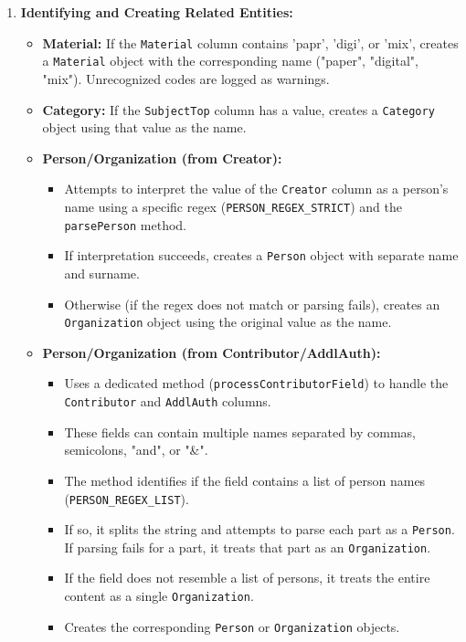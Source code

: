 \begin{enumerate}
    \item \textbf{Identifying and Creating Related Entities:}
        \begin{itemize}
            \item \textbf{Material:} If the \texttt{Material} column contains 'papr', 'digi', or 'mix', creates a \texttt{Material} object with the corresponding name ("paper", "digital", "mix"). Unrecognized codes are logged as warnings.
            \item \textbf{Category:} If the \texttt{SubjectTop} column has a value, creates a \texttt{Category} object using that value as the name.
            \item \textbf{Person/Organization (from Creator):}
                \begin{itemize}
                    \item Attempts to interpret the value of the \texttt{Creator} column as a person's name using a specific regex (\texttt{PERSON\_REGEX\_STRICT}) and the \texttt{parsePerson} method.
                    \item If interpretation succeeds, creates a \texttt{Person} object with separate name and surname.
                    \item Otherwise (if the regex does not match or parsing fails), creates an \texttt{Organization} object using the original value as the name.
                \end{itemize}
            \item \textbf{Person/Organization (from Contributor/AddlAuth):}
                \begin{itemize}
                    \item Uses a dedicated method (\texttt{processContributorField}) to handle the \texttt{Contributor} and \texttt{AddlAuth} columns.
                    \item These fields can contain multiple names separated by commas, semicolons, "and", or "\&".
                    \item The method identifies if the field contains a list of person names (\texttt{PERSON\_REGEX\_LIST}).
                    \item If so, it splits the string and attempts to parse each part as a \texttt{Person}. If parsing fails for a part, it treats that part as an \texttt{Organization}.
                    \item If the field does not resemble a list of persons, it treats the entire content as a single \texttt{Organization}.
                    \item Creates the corresponding \texttt{Person} or \texttt{Organization} objects.
                \end{itemize}
        \end{itemize}


\end{enumerate}
